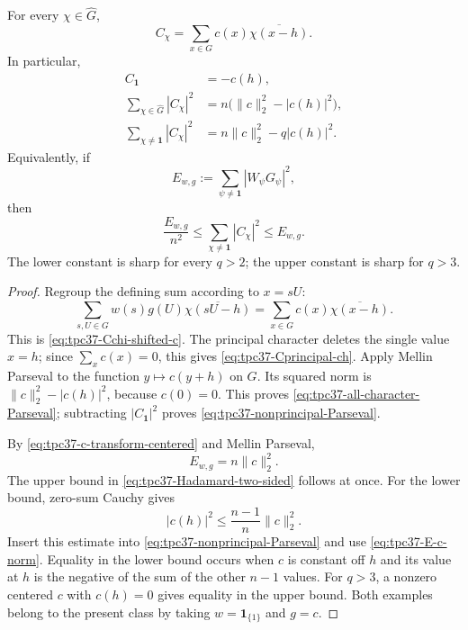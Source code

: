 \begin{theorem}
\label{thm:tpc37-shifted-Parseval}
For every \(\chi\in\widehat G\),
\begin{equation}
 \boxed{
 C_\chi=\sum_{x\in G}c(x)\overline{\chi(x-h)}.}
 \label{eq:tpc37-Cchi-shifted-c}
\end{equation}
In particular,
\begin{align}
 C_{\mathbf1}&=-c(h),
 \label{eq:tpc37-Cprincipal-ch}\\
 \sum_{\chi\in\widehat G}|C_\chi|^2
 &=n\bigl(\|c\|_2^2-|c(h)|^2\bigr),
 \label{eq:tpc37-all-character-Parseval}\\
 \sum_{\chi\ne\mathbf1}|C_\chi|^2
 &=\boxed{n\|c\|_2^2-q|c(h)|^2}.
 \label{eq:tpc37-nonprincipal-Parseval}
\end{align}
Equivalently, if
\begin{equation}
 E_{w,g}:=\sum_{\psi\ne\mathbf1}|W_\psi G_\psi|^2,
 \label{eq:tpc37-Hadamard-energy}
\end{equation}
then
\begin{equation}
 \boxed{
 \frac{E_{w,g}}{n^2}
 \le \sum_{\chi\ne\mathbf1}|C_\chi|^2
 \le E_{w,g}.}
 \label{eq:tpc37-Hadamard-two-sided}
\end{equation}
The lower constant is sharp for every \(q>2\); the upper constant is
sharp for \(q>3\).
\end{theorem}

\begin{proof}
Regroup the defining sum according to \(x=sU\):
\[
 \sum_{s,U\in G}w(s)g(U)\overline{\chi(sU-h)}
 =\sum_{x\in G}c(x)\overline{\chi(x-h)}.
\]
This is \eqref{eq:tpc37-Cchi-shifted-c}.  The principal character deletes
the single value \(x=h\); since \(\sum_xc(x)=0\), this gives
\eqref{eq:tpc37-Cprincipal-ch}.  Apply Mellin Parseval to the function
\(y\mapsto c(y+h)\) on \(G\).  Its squared norm is
\(\|c\|_2^2-|c(h)|^2\), because \(c(0)=0\).  This proves
\eqref{eq:tpc37-all-character-Parseval}; subtracting
\(|C_{\mathbf1}|^2\) proves
\eqref{eq:tpc37-nonprincipal-Parseval}.

By \eqref{eq:tpc37-c-transform-centered} and Mellin Parseval,
\begin{equation}
 E_{w,g}=n\|c\|_2^2.
 \label{eq:tpc37-E-c-norm}
\end{equation}
The upper bound in \eqref{eq:tpc37-Hadamard-two-sided} follows at once.
For the lower bound, zero-sum Cauchy gives
\[
 |c(h)|^2
 \le\frac{n-1}{n}\|c\|_2^2.
\]
Insert this estimate into \eqref{eq:tpc37-nonprincipal-Parseval} and use
\eqref{eq:tpc37-E-c-norm}.  Equality in the lower bound occurs when
\(c\) is constant off \(h\) and its value at \(h\) is the negative of
the sum of the other \(n-1\) values.  For \(q>3\), a nonzero centered
\(c\) with \(c(h)=0\) gives equality in the upper bound.  Both examples
belong to the present class by taking \(w=\mathbf1_{\{1\}}\) and
\(g=c\).
\end{proof}

